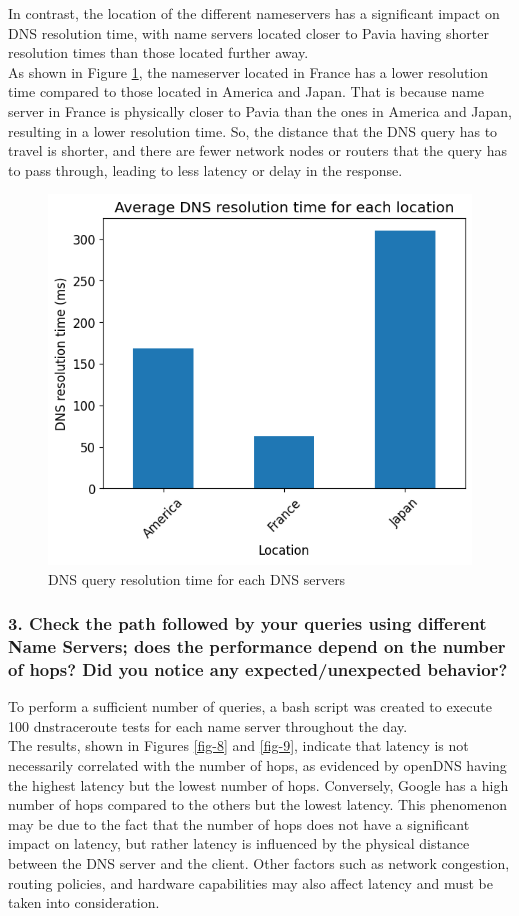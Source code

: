 \documentclass[eng]{class}
\begin{document}
In contrast, the location of the different nameservers has a significant impact on DNS resolution time,
with name servers located closer to Pavia having shorter resolution times than those located further away.\\
As shown in Figure \ref{fig-7}, the nameserver located in France has a lower resolution time compared to those located in America and Japan.
That is because name server in France is physically closer to Pavia than the ones in America and Japan, resulting in a lower resolution time.
So, the distance that the DNS query has to travel is shorter, and there are fewer network nodes or routers that the query has to pass through, leading to less latency or delay in the response.
\begin{figure}[H]
    \centering
    \includegraphics[width=.7\columnwidth]{images/avgLat2.2.loc.png}
    \caption{DNS query resolution time for each DNS servers}
    \label{fig-7}
\end{figure}
\subsubsection*{3. Check the path followed by your queries using different Name Servers; does the
    performance depend on the number of hops? Did you notice any
    expected/unexpected behavior?}

To perform a sufficient number of queries, a bash script was created to execute 100 dnstraceroute tests for each name server throughout the day.\\
The results, shown in Figures \ref{fig-8} and \ref{fig-9}, indicate that latency is not necessarily correlated with the number of hops,
as evidenced by openDNS having the highest latency but the lowest number of hops.
Conversely, Google has a high number of hops compared to the others but the lowest latency.
This phenomenon may be due to the fact that the number of hops does not have a significant impact on latency,
but rather latency is influenced by the physical distance between the DNS server and the client.
Other factors such as network congestion, routing policies, and hardware capabilities may also affect latency and must be taken into consideration.
\end{document}
